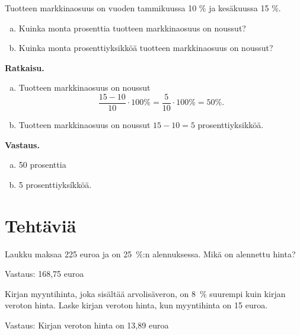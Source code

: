\begin{esimerkki}
    Tuotteen markkinaosuus on vuoden tammikuussa 10 \% ja kesäkuussa 15 \%. 
    \begin{enumerate}[a)]
    \item Kuinka monta prosenttia tuotteen markkinaosuus on noussut?
    
    \item Kuinka monta prosenttiyksikköä tuotteen markkinaosuus on noussut?
    \end{enumerate}
    
    {\bf Ratkaisu.} 
    
    \begin{enumerate}[a)]
    \item Tuotteen markkinaosuus on noussut
    \[
    \frac{15-10}{10} \cdot 100 \%= \frac{5}{10}\cdot 100\% = 50\%.
    \]
    
    \item Tuotteen markkinaosuus on noussut $15-10=5$ prosenttiyksikköä. 
    \end{enumerate}
    
    {\bf Vastaus.}
    
    \begin{enumerate}[a)]
    \item 50 prosenttia
    \item 5 prosenttiyksíkköä.
    \end{enumerate}
\end{esimerkki}

\section*{Tehtäviä}

\begin{tehtava}
    Laukku maksaa 225 euroa ja on 25~\%:n alennuksessa. Mikä on alennettu hinta?
    \begin{vastaus}
    Vastaus: 168,75 euroa
    \end{vastaus}
\end{tehtava}

\begin{tehtava}
    Kirjan myyntihinta, joka sisältää arvolisäveron, on 8~\% suurempi kuin kirjan veroton hinta. Laske kirjan veroton hinta, kun myyntihinta on 15 euroa.
    \begin{vastaus}
        Vastaus: Kirjan veroton hinta on 13,89 euroa
    \end{vastaus}
\end{tehtava}

